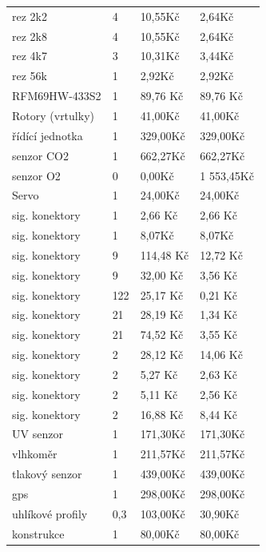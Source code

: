 \documentclass[a4paper]{report}
\begin{document}
\begin{longtable}{L{6cm}L{3cm}L{3cm}L{3cm}}
rez 2k2                 & 4         & 10,55Kč    & 2,64Kč      \\
rez 2k8                 & 4         & 10,55Kč    & 2,64Kč      \\
rez 4k7                 & 3         & 10,31Kč    & 3,44Kč      \\
rez 56k                 & 1         & 2,92Kč     & 2,92Kč      \\
RFM69HW-433S2           & 1         & 89,76 Kč   & 89,76 Kč    \\
Rotory (vrtulky)        & 1         & 41,00Kč    & 41,00Kč     \\
řídící jednotka         & 1         & 329,00Kč   & 329,00Kč    \\
senzor CO2              & 1         & 662,27Kč   & 662,27Kč    \\
senzor O2               & 0         & 0,00Kč     & 1 553,45Kč  \\
Servo                   & 1         & 24,00Kč    & 24,00Kč     \\
sig. konektory          & 1         & 2,66 Kč    & 2,66 Kč     \\
sig. konektory          & 1         & 8,07Kč     & 8,07Kč      \\
sig. konektory          & 9         & 114,48 Kč  & 12,72 Kč    \\
sig. konektory          & 9         & 32,00 Kč   & 3,56 Kč     \\
sig. konektory          & 122       & 25,17 Kč   & 0,21 Kč     \\
sig. konektory          & 21        & 28,19 Kč   & 1,34 Kč     \\
sig. konektory          & 21        & 74,52 Kč   & 3,55 Kč     \\
sig. konektory          & 2         & 28,12 Kč   & 14,06 Kč    \\
sig. konektory          & 2         & 5,27 Kč    & 2,63 Kč     \\
sig. konektory          & 2         & 5,11 Kč    & 2,56 Kč     \\
sig. konektory          & 2         & 16,88 Kč   & 8,44 Kč     \\
UV senzor               & 1         & 171,30Kč   & 171,30Kč    \\
vlhkoměr                & 1         & 211,57Kč   & 211,57Kč    \\
tlakový senzor          & 1         & 439,00Kč   & 439,00Kč    \\
gps                     & 1         & 298,00Kč   & 298,00Kč    \\
uhlíkové profily		& 0,3	    & 103,00Kč	 & 30,90Kč	   \\
konstrukce	            & 1     	& 80,00Kč	 & 80,00Kč     \\
\end{longtable} \newpage
\end{document}
